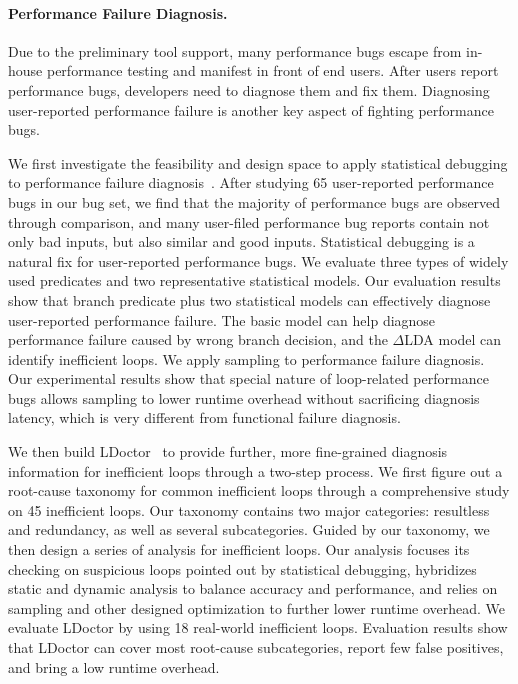 \documentclass[10pt]{article}
\begin{document}
\vspace{-.1in}
\paragraph{Performance Failure Diagnosis.}
Due to the preliminary tool support, many performance bugs escape from in-house performance testing and manifest in front of end users. 
After users report performance bugs, developers need to diagnose them and fix them.
Diagnosing user-reported performance failure is another key aspect of fighting performance bugs. 

We first investigate the feasibility and design space to apply statistical debugging to performance failure diagnosis~\cite{Song14OOPSLA}.
After studying 65 user-reported performance bugs in our bug set, 
we find that the majority of performance bugs are observed through comparison, 
and many user-filed performance bug reports contain not only bad inputs, but also similar and good inputs.
Statistical debugging is a natural fix for user-reported performance bugs. 
We evaluate three types of widely used predicates and two representative statistical models. 
Our evaluation results show that branch predicate plus two statistical models can effectively diagnose user-reported performance failure. 
The basic model can help diagnose performance failure caused by wrong branch decision, and the $\Delta$LDA model can identify inefficient loops.  
We apply sampling to performance failure diagnosis. Our experimental results show that
special nature of loop-related performance bugs allows sampling to lower runtime overhead without sacrificing diagnosis latency, 
which is very different from functional failure diagnosis.

We then build LDoctor~\cite{Song17ICSE} to provide further, more fine-grained diagnosis information for inefficient loops through a two-step process. 
We first figure out a root-cause taxonomy for common inefficient loops through a comprehensive study on 45 inefficient loops. 
Our taxonomy contains two major categories: resultless and redundancy, as well as several subcategories. 
Guided by our taxonomy, we then design a series of analysis for inefficient loops. 
Our analysis 
focuses its checking on suspicious loops pointed out by statistical debugging, 
hybridizes static and dynamic analysis to balance accuracy and performance, 
and relies on sampling and other designed optimization to further lower runtime overhead. 
We evaluate LDoctor by using 18 real-world inefficient loops. 
Evaluation results show that LDoctor can cover most root-cause subcategories, 
report few false positives, and bring a low runtime overhead. 
\end{document}
